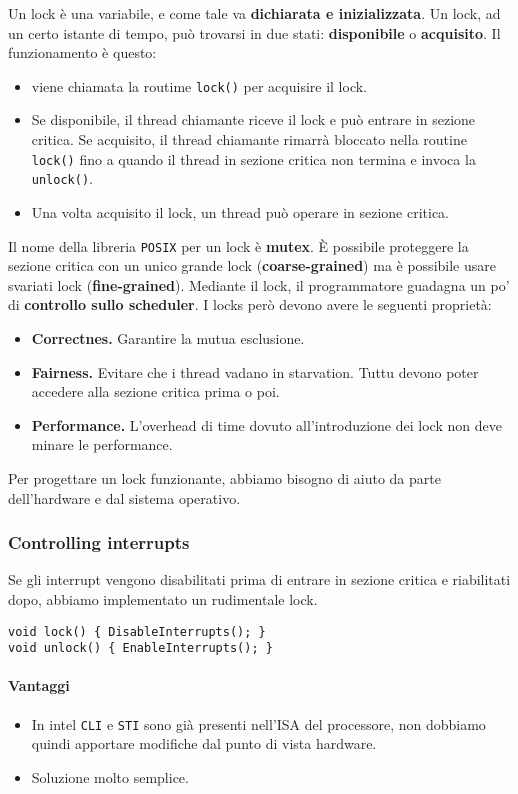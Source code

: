 \documentclass[12pt, letterpaper]{article}
\begin{document}
			Un lock è una variabile, e come tale va \textbf{dichiarata e inizializzata}. Un lock, ad un certo istante di tempo, può trovarsi in due stati: \textbf{disponibile} o \textbf{acquisito}. Il funzionamento è questo:
			\begin{itemize}
				\item viene chiamata la routime \texttt{lock()} per acquisire il lock.
				\item Se disponibile, il thread chiamante riceve il lock e può entrare in sezione critica. Se acquisito, il thread chiamante rimarrà bloccato nella routine \texttt{lock()} fino a quando il thread in sezione critica non termina e invoca la \texttt{unlock()}.
				\item Una volta acquisito il lock, un thread può operare in sezione critica. 
			\end{itemize}
			Il nome della libreria \texttt{POSIX} per un lock è \textbf{mutex}. È possibile proteggere la sezione critica con un unico grande lock (\textbf{coarse-grained}) ma è possibile usare svariati lock (\textbf{fine-grained}). Mediante il lock, il programmatore guadagna un po' di \textbf{controllo sullo scheduler}. I locks però devono avere le seguenti proprietà:
			\begin{itemize}
				\item \textbf{Correctnes.} Garantire la mutua esclusione.
				\item \textbf{Fairness.} Evitare che i thread vadano in starvation. Tuttu devono poter accedere alla sezione critica prima o poi.
				\item \textbf{Performance.} L'overhead di time dovuto all'introduzione dei lock non deve minare le performance. 
			\end{itemize}
			Per progettare un lock funzionante, abbiamo bisogno di aiuto da parte dell'hardware e dal sistema operativo.
			\subsubsection{Controlling interrupts}
				Se gli interrupt vengono disabilitati prima di entrare in sezione critica e riabilitati dopo, abbiamo implementato un rudimentale lock.
				\begin{lstlisting}[style=CStyle]
void lock() { DisableInterrupts(); }
void unlock() { EnableInterrupts(); } \end{lstlisting}	
				
				\paragraph{Vantaggi}
					\begin{itemize}
						\item In intel \texttt{CLI} e \texttt{STI} sono già presenti nell'ISA del processore, non dobbiamo quindi apportare modifiche dal punto di vista hardware.
						\item Soluzione molto semplice.
					\end{itemize}
\end{document}
